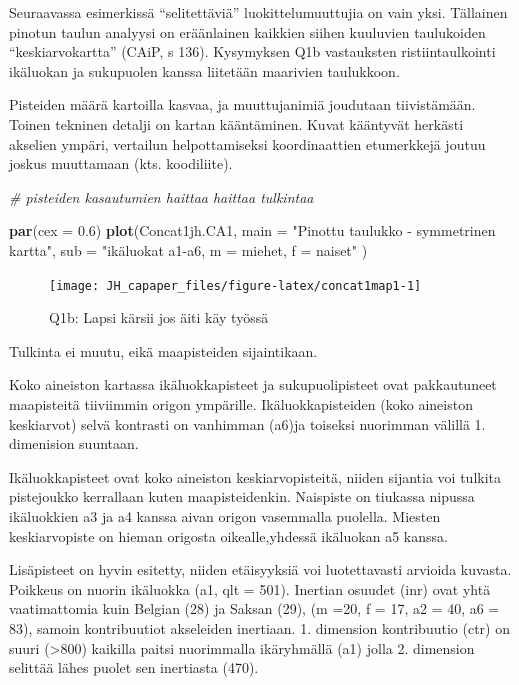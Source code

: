 \documentclass[
  finnish,
]{book}
\newenvironment{Shaded}{\begin{snugshade}}{\end{snugshade}}
\newcommand{\CommentTok}[1]{\textcolor[rgb]{0.56,0.35,0.01}{\textit{#1}}}
\newcommand{\DataTypeTok}[1]{\textcolor[rgb]{0.13,0.29,0.53}{#1}}
\newcommand{\FloatTok}[1]{\textcolor[rgb]{0.00,0.00,0.81}{#1}}
\newcommand{\KeywordTok}[1]{\textcolor[rgb]{0.13,0.29,0.53}{\textbf{#1}}}
\newcommand{\NormalTok}[1]{#1}
\newcommand{\StringTok}[1]{\textcolor[rgb]{0.31,0.60,0.02}{#1}}
\begin{document}
Seuraavassa esimerkissä ``selitettäviä'' luokittelumuuttujia on vain yksi. Tällainen
pinotun taulun analyysi on eräänlainen kaikkien siihen kuuluvien taulukoiden
``keskiarvokartta'' (CAiP, s 136). Kysymyksen Q1b vastauksten ristiintaulkointi
ikäluokan ja sukupuolen kanssa liitetään maarivien taulukkoon.

Pisteiden määrä kartoilla kasvaa, ja muuttujanimiä joudutaan tiivistämään.
Toinen tekninen detalji on kartan kääntäminen. Kuvat kääntyvät herkästi akselien
ympäri, vertailun helpottamiseksi koordinaattien etumerkkejä joutuu joskus
muuttamaan (kts. koodiliite).

\begin{Shaded}
\begin{Highlighting}[]
\CommentTok{# pisteiden kasautumien haittaa haittaa tulkintaa}

\KeywordTok{par}\NormalTok{(}\DataTypeTok{cex =} \FloatTok{0.6}\NormalTok{) }
\KeywordTok{plot}\NormalTok{(Concat1jh.CA1,}
     \DataTypeTok{main =} \StringTok{"Pinottu taulukko - symmetrinen kartta"}\NormalTok{,}
     \DataTypeTok{sub =} \StringTok{"ikäluokat a1-a6, m = miehet, f = naiset"}
\NormalTok{     )}
\end{Highlighting}
\end{Shaded}

\begin{figure}

{\centering \texttt{[image: JH\_capaper\_files/figure-latex/concat1map1-1]} 

}

\caption{Q1b: Lapsi kärsii jos äiti käy työssä}\label{fig:concat1map1}
\end{figure}

Tulkinta ei muutu, eikä maapisteiden sijaintikaan.

Koko aineiston kartassa ikäluokkapisteet ja sukupuolipisteet ovat pakkautuneet
maapisteitä tiiviimmin origon ympärille. Ikäluokkapisteiden (koko aineiston
keskiarvot) selvä kontrasti on vanhimman (a6)ja toiseksi
nuorimman välillä 1. dimenision suuntaan.

Ikäluokkapisteet ovat koko aineiston keskiarvopisteitä, niiden sijantia voi
tulkita pistejoukko kerrallaan kuten maapisteidenkin. Naispiste on tiukassa
nipussa ikäluokkien a3 ja a4 kanssa aivan origon vasemmalla puolella. Miesten
keskiarvopiste on hieman origosta oikealle,yhdessä ikäluokan a5 kanssa.

Lisäpisteet on hyvin esitetty, niiden etäisyyksiä voi luotettavasti arvioida
kuvasta. Poikkeus on nuorin ikäluokka (a1, qlt = 501). Inertian osuudet (inr)
ovat yhtä vaatimattomia kuin Belgian (28) ja Saksan (29),
(m =20, f = 17, a2 = 40, a6 = 83), samoin kontribuutiot akseleiden inertiaan.
1. dimension kontribuutio (ctr) on suuri (\textgreater800) kaikilla paitsi nuorimmalla
ikäryhmällä (a1) jolla 2. dimension selittää lähes puolet sen inertiasta (470).
\end{document}
